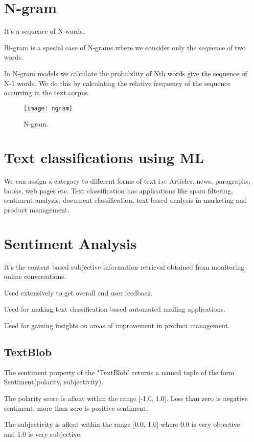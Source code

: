 	\section{N-gram}
	\begin{bulletedlist}
		\item It's a sequence of N-words.
		\item Bi-gram is a special case of N-grams where we consider only the sequence of two words.
		\item In N-gram models we calculate the probability of Nth words give the sequence of N-1 words. We do this by calculating the relative frequency of the sequence occurring in the text corpus.
	\end{bulletedlist}

	\begin{figure}[h]
		\centering
		\texttt{[image: ngram]}
		\caption[N-gram]{N-gram.}
		\label{fig:ngram}
	\end{figure}

	\section{Text classifications using ML}
We can assign a category to different forms of text i.e. Articles, news, paragraphs, books, web pages etc.  Text classification has applications like spam filtering, sentiment analysis, document classification, text based analysis in marketing and product management.

	\section{Sentiment Analysis}
	\begin{bulletedlist}
		\item It's the content based subjective information retrieval obtained from monitoring online conversations.
		\item Used extensively to get overall end user feedback.
		\item Used for making text classification based automated mailing applications.
		\item Used for gaining insights on areas of improvement in product management.
	\end{bulletedlist}

	\subsection{TextBlob}
The sentiment property of the "TextBlob" returns a named tuple of the form Sentiment(polarity, subjectivity).
	\begin{bulletedlist}
		\item The polarity score is afloat within the range [-1.0, 1.0].  Less than zero is negative sentiment, more than zero is positive sentiment.
		\item The subjectivity is afloat within the range [0.0, 1.0] where 0.0 is very objective and 1.0 is very subjective.
	\end{bulletedlist}

